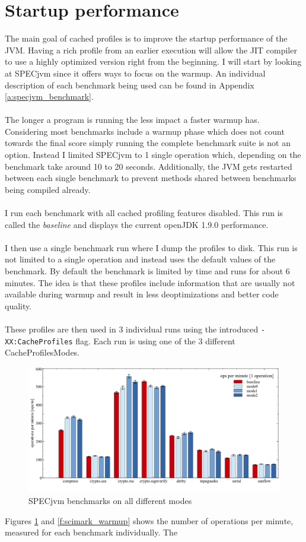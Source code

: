 \section{Startup performance}
\label{s:perf_general}
The main goal of cached profiles is to improve the startup performance of the JVM. Having a rich profile from an earlier execution will allow the JIT compiler to use a highly optimized version right from the beginning.
I will start by looking at SPECjvm since it offers ways to focus on the warmup. An individual description of each benchmark being used can be found in Appendix \ref{a:specjvm_benchmark}.
\\\\
The longer a program is running the less impact a faster warmup has. Considering most benchmarks include a warmup phase which does not count towards the final score simply running the complete benchmark suite is not an option.
Instead I limited SPECjvm to 1 single operation which, depending on the benchmark take around 10 to 20 seconds.
Additionally, the JVM gets restarted between each single benchmark to prevent methods shared between benchmarks being compiled already.
\\\\
I run each benchmark with all cached profiling features disabled. This run is called the \textit{baseline}     and displays the current openJDK 1.9.0 performance.    
\\\\ 
I then use a single benchmark run where I dump the profiles to disk. This run is not limited to a single operation and instead uses the default values of the benchmark. By default the benchmark is limited by time and runs for about 6 minutes. The idea is that these profiles include information that are usually not available during warmup and result in less deoptimizations and better code quality.
\\\\
These profiles are then used in 3 individual runs using the introduced \texttt{-XX:CacheProfiles} flag. Each run is using one of the 3 different CacheProfilesModes.
\begin{figure}[ht]
  \begin{center}
    \centering
    \includegraphics[width=1.0\textwidth]{figures/others_warmup.png}
    \caption{SPECjvm benchmarks on all different modes}
    \label{f:others_warmup}
  \end{center}
\end{figure}
Figures \ref{f:others_warmup} and \ref{f:scimark_warmup} shows the number of operations per minute, measured for each benchmark individually.
The 

